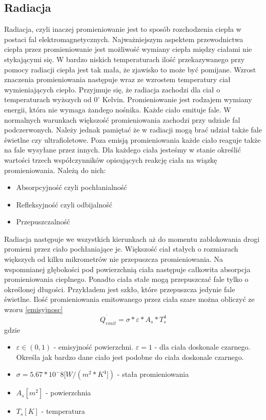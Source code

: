 \subsection {Radiacja}
Radiacja, czyli inaczej promieniowanie jest to sposób rozchodzenia ciepła w postaci fal elektromagnetycznych. 
Najważniejszym aspektem przewodnictwa ciepła przez promieniowanie jest możliwość wymiany ciepła między ciałami
nie stykającymi się.
W bardzo niskich temperaturach ilość przekazywanego przy pomocy radiacji ciepła jest tak mała, że zjawisko to może być pomijane.
Wzrost znaczenia promieniowania następuje wraz ze wzrostem temperatury ciał wymieniających ciepło.
Przyjmuje się, że radiacja zachodzi dla ciał o temperaturach wyższych od $0 ^\circ$ Kelvin.
Promieniowanie jest rodzajem wymiany energii, która nie wymaga żandego nośnika. Każde ciało emituje fale.
W normalnych warunkach większość promieniowania zachodzi przy udziale fal podczerwonych. Należy jednak pamiętać
że w radiacji mogą brać udział także fale świetlne czy ultrafioletowe. Poza emisją promieniowania każde ciało reaguje także
na fale wysyłane przez innych. Dla każdego ciała jesteśmy w stanie określić wartości trzech współczynników opisujących 
reakcję ciała na wiązkę promieniowania. Należą do nich:
\begin {itemize}
\item Absorpcyjność czyli pochłanialność
\item Refleksyjność czyli odbijalność
\item Przepuszczalność
\end {itemize}
Radiacja następuje we wszystkich kierunkach aż  do momentu zablokowania drogi promieni przez ciało pochłaniające je.
Większość ciał stałych o rozmiarach większych od kilku mikrometrów nie przepuszcza promieniowania. Na wspomnianej 
głębokości pod powierzchnią ciała następuje całkowita absorpcja promieniowania cieplnego. Ponadto ciała stałe mogą przepuszczać
fale tylko o określonej długości. Przykładem jest szkło, które przepuszcza jedynie fale świetlne.
Ilość promieniowania emitowanego przez ciała szare można obliczyć ze wzoru \ref{emisyjnosc}
\begin {equation}
\dot{Q_{emit}}=\sigma*\varepsilon*A_{s}*T_{s}^4
\label {emisyjnosc}
\end {equation}
gdzie
\begin{itemize}
\item $\varepsilon \in (0,1)$ - emisyjność powierzchni. $\varepsilon=1$ - dla ciała doskonale czarnego. Określa jak bardzo dane 
ciało jest podobne do ciała doskonale czarnego.
\item $\sigma = 5.67 * 10^-8 [W/(m^2 * K^4]) $ - stała promieniowania
\item $A_{s} [m^2]$ - powierzchnia 
\item $T_{s} [K]$ - temperatura
\end {itemize}
